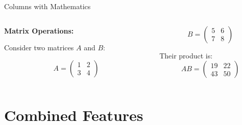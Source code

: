 \documentclass[aspectratio=169]{beamer}
\begin{document}
\begin{frame}{Columns with Mathematics}
  \begin{columns}
    \begin{column}{0.5\textwidth}
      \textbf{Matrix Operations:}
      
      Consider two matrices $A$ and $B$:
      
      \[
      A = \begin{pmatrix}
        1 & 2 \\
        3 & 4
      \end{pmatrix}
      \]
    \end{column}
    
    \begin{column}{0.5\textwidth}
      \[
      B = \begin{pmatrix}
        5 & 6 \\
        7 & 8
      \end{pmatrix}
      \]
      
      \vspace{0.3cm}
      
      Their product is:
      \[
      AB = \begin{pmatrix}
        19 & 22 \\
        43 & 50
      \end{pmatrix}
      \]
    \end{column}
  \end{columns}
\end{frame}

\section{Combined Features}
\end{document}
